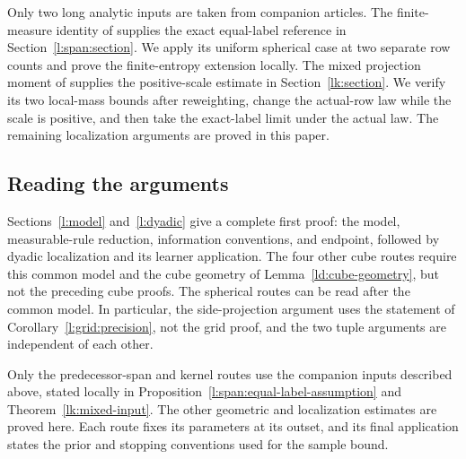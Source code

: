 Only two long analytic inputs are taken from companion articles.
The finite-measure identity of \cite[Theorem~3.3]{OpenAIReplica2026}
supplies the exact equal-label reference in
Section~\ref{l:span:section}. We apply its uniform spherical case
at two separate row counts and prove the finite-entropy extension
locally. The mixed projection moment of
\cite[Theorem~3.1]{OpenAIRow2026} supplies the positive-scale
estimate in Section~\ref{lk:section}. We verify its two local-mass
bounds after reweighting, change the actual-row law while the scale
is positive, and then take the exact-label limit under the actual
law. The remaining localization arguments are proved in this paper.

\subsection{Reading the arguments}

Sections~\ref{l:model} and~\ref{l:dyadic} give a complete first proof:
the model, measurable-rule reduction, information conventions, and
endpoint, followed by dyadic localization and its learner application.
The four other cube routes require this common model and the cube
geometry of Lemma~\ref{ld:cube-geometry}, but not the preceding cube
proofs. The spherical routes can be read after the common model.
In particular, the side-projection argument uses the statement of
Corollary~\ref{l:grid:precision}, not the grid proof, and the two tuple
arguments are independent of each other.

Only the predecessor-span and kernel routes use the companion inputs
described above, stated locally in
Proposition~\ref{l:span:equal-label-assumption} and
Theorem~\ref{lk:mixed-input}. The other geometric and localization
estimates are proved here. Each route fixes its parameters at its
outset, and its final application states the prior and stopping
conventions used for the sample bound.
